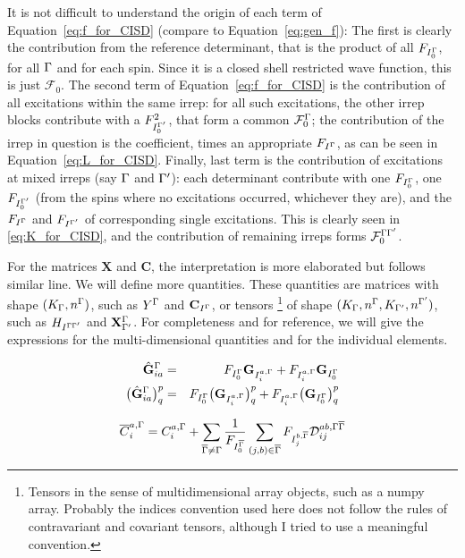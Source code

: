 \documentclass[a4paper,11pt]{article}
\begin{document}
It is not difficult to understand the origin of each term of Equation~\eqref{eq:f_for_CISD} (compare to Equation~\eqref{eq:gen_f}):
The first is clearly the contribution from the reference determinant, that is the product of all $F_{I_0^{\Gamma}}$, for all $\Gamma$ and for each spin.
Since it is a closed shell restricted wave function, this is just $\mathcal{F}_0$.
The second term of Equation~\eqref{eq:f_for_CISD} is the contribution of all excitations within the same irrep:
for all such excitations, the other irrep blocks contribute with a $F_{I_0^{\Gamma'}}^2$, that form a common $\mathcal{F}_0^{\Gamma}$;
the contribution of the irrep in question is the coefficient, times an appropriate $F_{I^{\Gamma}}$, as can be seen in Equation~\eqref{eq:L_for_CISD}.
Finally, last term is the contribution of excitations at mixed irreps (say $\Gamma$ and ${\Gamma'}$):
each determinant contribute with one $F_{I_0^{\Gamma}}$, one $F_{I_0^{\Gamma'}}$ (from the spins where no excitations occurred, whichever they are), and the $F_{I^{\Gamma}}$ and $F_{I^{\Gamma'}}$ of corresponding single excitations.
This is clearly seen in \eqref{eq:K_for_CISD}, and the contribution of remaining irreps forms $\mathcal{F}_0^{\Gamma{\ensuremath{\Gamma'}}}$.

For the matrices $\mathbf{X}$ and $\mathbf{C}$, the interpretation is more elaborated but follows similar line.
We will define more quantities.
These quantities are matrices with shape $(K_{\Gamma},n^{\Gamma})$, such as $Y^{\Gamma}$ and $\mathbf{C}_{I^{\Gamma}}$, or tensors
\footnote{Tensors in the sense of multidimensional array objects, such as a numpy array. Probably the indices convention used here does not follow the rules of contravariant and covariant tensors, although I tried to use a meaningful convention.}
of shape $(K_{\Gamma},n^{\Gamma},K_{\Gamma'},n^{\Gamma'})$, such as $H_{I^{\Gamma{\ensuremath{\Gamma'}}}}$ and $\mathbf{X}^{\Gamma}_{\Gamma'}$.
For completeness and for reference, we will give the expressions for the multi-dimensional quantities and for the individual elements.

\begin{eqnarray}
  \hat{{\mathbf{G}}}_{ia}^{\Gamma}
  &=& F_{I_0^{\Gamma}} {\mathbf{G}}_{I_i^{a,\Gamma}}
      + F_{I_i^{a,\Gamma}} {\mathbf{G}}_{I_0^{\Gamma}}\\
  \big( \hat{{\mathbf{G}}}_{ia}^{\Gamma} \big)^p_q
  &=& F_{I_0^{\Gamma}} \big( {\mathbf{G}}_{I_i^{a,\Gamma}}\big)^p_q
      + F_{I_i^{a,\Gamma}} \big( {\mathbf{G}}_{I_0^{\Gamma}}\big)^p_q
\end{eqnarray}

\begin{equation}
  \overline{C}_i^{a,\Gamma} = C_{i}^{a, \Gamma}
  + \sum_{{\overline{\Gamma}} \ne \Gamma} \frac{1}{F_{I_0^{{\overline{\Gamma}}}}}
  \sum_{(j,b) \in {\ensuremath{\overline{\Gamma}}}} F_{I_j^{b,{\overline{\Gamma}}}} \mathcal{D}_{ij}^{ab, \Gamma{\ensuremath{\overline{\Gamma}}}}
\end{equation}
\end{document}
